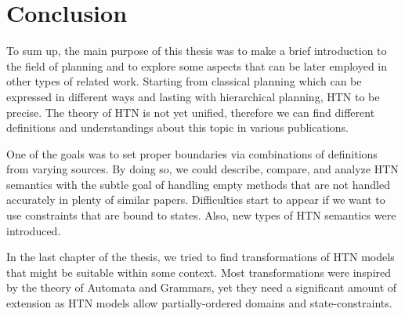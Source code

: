 \chapter*{Conclusion}

\noindent
To sum up, the main purpose of this thesis was to make a brief introduction to the field of planning and to explore some aspects that can be later employed in other types of related work. Starting from classical planning which can be expressed in different ways and lasting with hierarchical planning, HTN to be precise. The theory of HTN is not yet unified, therefore we can find different definitions and understandings about this topic in various publications. 

\medskip\noindent
One of the goals was to set proper boundaries via combinations of definitions from varying sources. By doing so, we could describe, compare, and analyze HTN semantics with the subtle goal of handling empty methods that are not handled accurately in plenty of similar papers. Difficulties start to appear if we want to use constraints that are bound to states. Also, new types of HTN semantics were introduced.

\medskip\noindent
In the last chapter of the thesis, we tried to find transformations of HTN models that might be suitable within some context. Most transformations were inspired by the theory of Automata and Grammars, yet they need a significant amount of extension as HTN models allow partially-ordered domains and state-constraints. 

\medskip\noindent
{}

